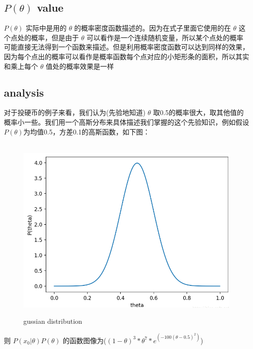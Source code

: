 \documentclass[12pt]{ctexart}%
\begin{document}
		\subsection{\quad $P(\theta)$ value}
			$P(\theta)$ 实际中是用的 $\theta$ 的概率密度函数描述的。因为在式子里面它使用的在 $\theta$ 这个点处的概率，但是由于 $\theta$ 可以看作是一个连续随机变量，所以某个点处的概率可能直接无法得到一个函数来描述。但是利用概率密度函数可以达到同样的效果，因为每个点出的概率可以看作是概率函数每个点对应的小矩形条的面积，所以其实和乘上每个 $\theta$ 值处的概率效果是一样
		
		\subsection{\quad analysis}
			对于投硬币的例子来看，我们认为(先验地知道) $\theta$ 取0.5的概率很大，取其他值的概率小一些。我们用一个高斯分布来具体描述我们掌握的这个先验知识，例如假设 $P(\theta)$为均值0.5，方差0.1的高斯函数，如下图：
				\begin{figure}[H]
					\vspace{-0.5cm}  %
					\setlength{\abovecaptionskip}{-0.2cm}   %
					\centering
					\includegraphics[scale=0.4]{gussian_distribution.png}
					\renewcommand{\figurename}{Fig} %
					\caption{gussian distribution}
					\label{fig:4}
				\end{figure}
			则 $P(x_0|\theta) P(\theta)$ 的函数图像为($(1-\theta)^3*\theta^7*e^{(-100(\theta-0.5)^2)}$)
\end{document}
